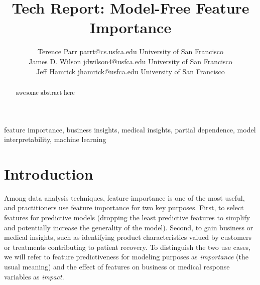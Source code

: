 \documentclass[twoside,11pt]{article}
\begin{document}
\def\spacingset#1{\renewcommand{\baselinestretch}%
{#1}\small\normalsize} \spacingset{1}



\title{\bf Tech Report: Model-Free Feature Importance}

\author{Terence Parr \email parrt@cs.usfca.edu
\addr University of San Francisco\\
\AND James D. Wilson \email jdwilson4@usfca.edu
\addr University of San Francisco\\
\AND Jeff Hamrick \email jhamrick@usfca.edu
      \addr University of San Francisco}

\maketitle

\begin{abstract}%
awesome abstract here
\end{abstract}

\begin{keywords}
feature importance, business insights, medical insights, partial dependence, model interpretability, machine learning
\end{keywords}

\section{Introduction}
\label{sec:intro}

Among data analysis techniques, feature importance is one of the most  useful, and practitioners use feature importance for two key purposes. First, to select features for predictive models (dropping the least predictive features to simplify and potentially increase the generality of the model). Second, to gain business or medical insights, such as identifying product characteristics valued by customers or treatments contributing to patient recovery.  To distinguish the two use cases, we will refer to feature predictiveness for modeling purposes as {\em importance} (the usual meaning) and the effect of features on business or medical response variables as {\em impact}.
\end{document}

